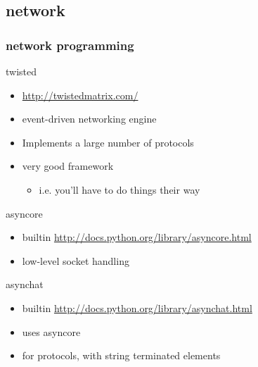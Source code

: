 \documentclass{beamer}
\begin{document}
\subsection*{network}
\begin{frame}[allowframebreaks]
	\frametitle{network programming}
	\begin{block}{twisted}
	\begin{itemize}
		\item \url{http://twistedmatrix.com/}
		\item event-driven networking engine
		\item Implements a large number of protocols
		\item very good framework
		\begin{itemize}
			\item i.e. you'll have to do things their way
		\end{itemize}
	\end{itemize}
	\end{block}	
\framebreak
	\begin{block}{asyncore}
	\begin{itemize}
		\item builtin \url{http://docs.python.org/library/asyncore.html}
		\item low-level socket handling
	\end{itemize}
	\end{block}
	
	\begin{block}{asynchat}
	\begin{itemize}
		\item builtin \url{http://docs.python.org/library/asynchat.html}
		\item uses asyncore
		\item for protocols, with string terminated elements
	\end{itemize}
	\end{block}
\end{frame}
\end{document}
